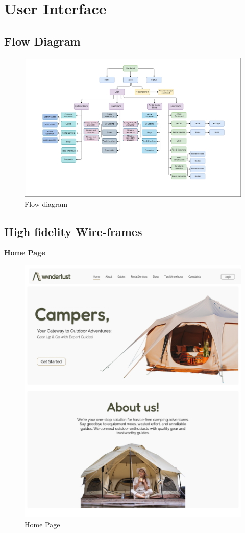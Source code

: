 \section{User Interface}
\subsection{Flow Diagram}
\begin{figure}[h!]
    \centering
    \includegraphics[width=1\textwidth]{Images/Flow Diagram.drawio.png}
    \caption{Flow diagram}
\end{figure}
\clearpage


\subsection{ High fidelity Wire-frames}
\textbf{Home Page}\\
\begin{figure}[h!]
    \centering
    \includegraphics[width=1\textwidth]{Images/Wireframes/Landing Page - srs.png}
    \caption{Home Page}
\end{figure}
\clearpage

